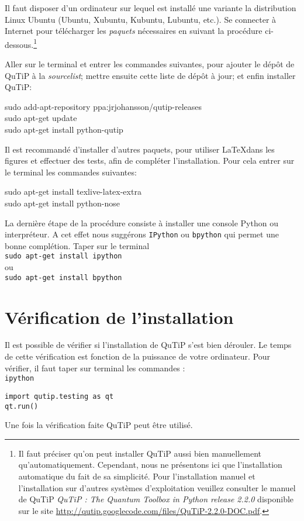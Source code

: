 Il faut disposer d'un ordinateur sur lequel est installé une variante la 
distribution Linux Ubuntu (Ubuntu, Xubuntu, Kubuntu, Lubuntu, etc.). Se 
connecter à Internet pour télécharger les \emph{paquets} nécessaires 
en suivant la procédure ci-dessous.\footnote{Il faut préciser qu'on peut 
installer QuTiP aussi bien manuellement qu'automatiquement. Cependant, nous ne 
présentons ici que l'installation automatique du fait de sa simplicité. Pour 
l'installation manuel et l'installation sur d'autres systèmes d'exploitation 
veuillez consulter le manuel de QuTiP \emph{QuTiP : The Quantum Toolbox in 
Python release 2.2.0} disponible sur le site 
\url{http://qutip.googlecode.com/files/QuTiP-2.2.0-DOC.pdf}.}

Aller sur le terminal et entrer les commandes suivantes, pour ajouter le dépôt 
de QuTiP à la \emph{sourcelist}; mettre ensuite cette liste de dépôt à jour; 
et enfin installer QuTiP:\\
\begin{tt}
sudo add-apt-repository ppa:jrjohansson/qutip-releases\\
sudo apt-get update\\
sudo apt-get install python-qutip\\
\end{tt}

Il est recommandé d'installer d'autres paquets, pour utiliser \LaTeX dans les 
figures et effectuer des tests, afin de compléter l'installation. Pour cela 
entrer sur le terminal les commandes suivantes:\\
\begin{tt}
sudo apt-get install texlive-latex-extra\\
sudo apt-get install python-nose
\end{tt}

La dernière étape de la procédure consiste à installer une console Python ou 
interpréteur. A cet effet nous suggérons \texttt{IPython} ou \texttt{bpython} 
qui permet une bonne complétion. Taper sur le terminal\\
\texttt{sudo apt-get install ipython}\\
ou\\
\texttt{sudo apt-get install bpython}

\section{Vérification de l'installation}

Il est possible de vérifier si l'installation de QuTiP s'est bien dérouler. Le 
temps de cette vérification est fonction de la puissance de votre ordinateur. 
Pour vérifier, il faut taper sur terminal les commandes :\\
\texttt{ipython} \\
\begin{lstlisting}
import qutip.testing as qt
qt.run()
\end{lstlisting}
Une fois la vérification faite QuTiP peut être utilisé.


